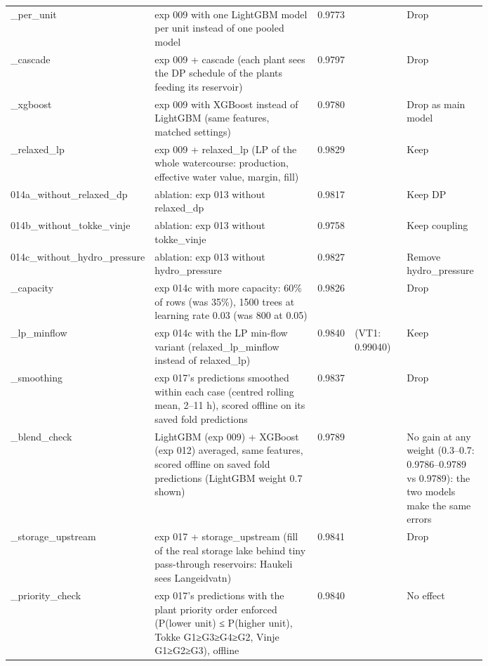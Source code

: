 \begin{longtable}{>{\raggedright\arraybackslash}p{0.16\linewidth}>{\raggedright\arraybackslash}p{0.35\linewidth}l>{\raggedright\arraybackslash}p{0.11\linewidth}>{\raggedright\arraybackslash}p{0.17\linewidth}}
010\_\allowbreak{}per\_\allowbreak{}unit & exp 009 with one LightGBM model per unit instead of one pooled model & 0.9773 &  & Drop \\
011\_\allowbreak{}cascade & exp 009 + cascade (each plant sees the DP schedule of the plants feeding its reservoir) & 0.9797 &  & Drop \\
012\_\allowbreak{}xgboost & exp 009 with XGBoost instead of LightGBM (same features, matched settings) & 0.9780 &  & Drop as main model \\
013\_\allowbreak{}relaxed\_\allowbreak{}lp & exp 009 + relaxed\_\allowbreak{}lp (LP of the whole watercourse: production, effective water value, margin, fill) & 0.9829 &  & Keep \\
014a\_\allowbreak{}without\_\allowbreak{}relaxed\_\allowbreak{}dp & ablation: exp 013 without relaxed\_\allowbreak{}dp & 0.9817 &  & Keep DP \\
014b\_\allowbreak{}without\_\allowbreak{}tokke\_\allowbreak{}vinje & ablation: exp 013 without tokke\_\allowbreak{}vinje & 0.9758 &  & Keep coupling \\
014c\_\allowbreak{}without\_\allowbreak{}hydro\_\allowbreak{}pressure & ablation: exp 013 without hydro\_\allowbreak{}pressure & 0.9827 &  & Remove hydro\_\allowbreak{}pressure \\
016\_\allowbreak{}capacity & exp 014c with more capacity: 60\% of rows (was 35\%), 1500 trees at learning rate 0.03 (was 800 at 0.05) & 0.9826 &  & Drop \\
017\_\allowbreak{}lp\_\allowbreak{}minflow & exp 014c with the LP min-flow variant (relaxed\_\allowbreak{}lp\_\allowbreak{}minflow instead of relaxed\_\allowbreak{}lp) & 0.9840 & 0.99042 (VT1: 0.99040) & Keep \\
018\_\allowbreak{}smoothing & exp 017's predictions smoothed within each case (centred rolling mean, 2–11 h), scored offline on its saved fold predictions & 0.9837 &  & Drop \\
020\_\allowbreak{}blend\_\allowbreak{}check & LightGBM (exp 009) + XGBoost (exp 012) averaged, same features, scored offline on saved fold predictions (LightGBM weight 0.7 shown) & 0.9789 &  & No gain at any weight (0.3–0.7: 0.9786–0.9789 vs 0.9789): the two models make the same errors \\
019\_\allowbreak{}storage\_\allowbreak{}upstream & exp 017 + storage\_\allowbreak{}upstream (fill of the real storage lake behind tiny pass-through reservoirs: Haukeli sees Langeidvatn) & 0.9841 &  & Drop \\
022\_\allowbreak{}priority\_\allowbreak{}check & exp 017's predictions with the plant priority order enforced (P(lower unit) ≤ P(higher unit), Tokke G1≥G3≥G4≥G2, Vinje G1≥G2≥G3), offline & 0.9840 &  & No effect \\

\end{longtable}
